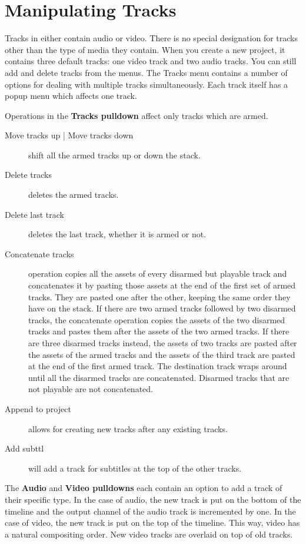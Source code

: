 \section{Manipulating Tracks}%
\label{sec:manipulating_tracks}

Tracks in \CGG{} either contain audio or video.  There is no special
designation for tracks other than the type of media they contain.
When you create a new project, it contains three default tracks: one
video track and two audio tracks.  You can still add and delete
tracks from the menus.  The Tracks menu contains a number of options
for dealing with multiple tracks simultaneously.  Each track itself
has a popup menu which affects one track.

Operations in the \textbf{Tracks pulldown} affect only tracks which
are armed.

\begin{description}
\item[Move tracks up | Move tracks down] shift all the armed
  tracks up or down the stack.
\item[Delete tracks] deletes the armed tracks.
\item[Delete last track] deletes the last track, whether it is
  armed or not.
\item[Concatenate tracks] operation copies all the assets of
  every disarmed but playable track and concatenates it by pasting
  those assets at the end of the first set of armed tracks. They are
  pasted one after the other, keeping the same order they have on the
  stack. If there are two armed tracks followed by two disarmed
  tracks, the concatenate operation copies the assets of the two
  disarmed tracks and pastes them after the assets of the two armed
  tracks. If there are three disarmed tracks instead, the assets of
  two tracks are pasted after the assets of the armed tracks and the
  assets of the third track are pasted at the end of the first armed
  track. The destination track wraps around until all the disarmed
  tracks are concatenated. Disarmed tracks that are not playable are
  not concatenated.
\item[Append to project] allows for creating new tracks after
  any existing tracks.
\item[Add subttl] will add a track for subtitles at the top of
  the other tracks.
\end{description}

The \textbf{Audio} and \textbf{Video pulldowns} each contain an
option to add a track of their specific type. In the case of audio,
the new track is put on the bottom of the timeline and the output
channel of the audio track is incremented by one. In the case of
video, the new track is put on the top of the timeline. This way,
video has a natural compositing order. New video tracks are overlaid
on top of old tracks.

